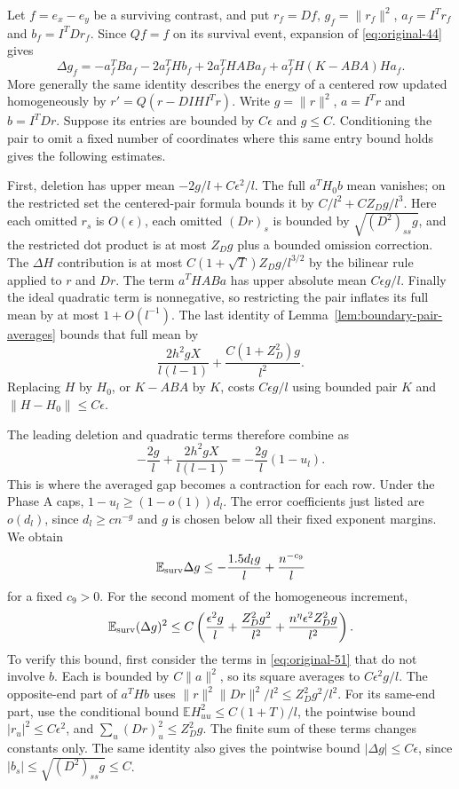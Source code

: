 Let $f=e_x-e_y$ be a surviving contrast, and put
$r_f=Df$, $g_f=\|r_f\|^2$, $a_f=I^Tr_f$ and
$b_f=I^TDr_f$.  Since $Qf=f$ on its survival event, expansion of
\eqref{eq:original-44} gives
\begin{equation}
 \Delta g_f=-a_f^TBa_f-2a_f^THb_f
       +2a_f^THABa_f+a_f^TH(K-ABA)Ha_f.
 \label{eq:original-51}
\end{equation}
More generally the same identity describes the energy of a centered
row updated homogeneously by $r'=Q(r-DIHI^Tr)$.
Write $g=\|r\|^2$, $a=I^Tr$ and $b=I^TDr$.
Suppose its entries are bounded by $C\epsilon$ and $g\le C$.
Conditioning the pair to omit a fixed number of coordinates where
this same entry bound holds gives the following estimates.

First, deletion has upper mean $-2g/l+C\epsilon^2/l$.
The full $a^TH_0b$ mean vanishes; on the restricted set the
centered-pair formula bounds it by
$C/l^2+CZ_Dg/l^3$.  Here each omitted $r_s$ is $O(\epsilon)$,
each omitted $(Dr)_s$ is bounded by
$\sqrt{(D^2)_{ss}g}$, and the restricted dot product is at most
$Z_Dg$ plus a bounded omission correction.
The $\Delta H$ contribution is at most
$C(1+\sqrt T)Z_Dg/l^{3/2}$ by the bilinear rule applied to
$r$ and $Dr$.
The term $a^THABa$ has upper absolute mean $C\epsilon g/l$.
Finally the ideal quadratic term is nonnegative, so restricting the
pair inflates its full mean by at most $1+O(l^{-1})$.
The last identity of Lemma~\ref{lem:boundary-pair-averages} bounds
that full mean by
\[
 \frac{2h^2gX}{l(l-1)}
       +\frac{C(1+Z_D^2)g}{l^2}.
\]
Replacing $H$ by $H_0$, or $K-ABA$ by $K$, costs
$C\epsilon g/l$ using bounded pair $K$ and
$\|H-H_0\|\le C\epsilon$.

The leading deletion and quadratic terms therefore combine as
\[
 -\frac{2g}{l}+\frac{2h^2gX}{l(l-1)}
 =-\frac{2g}{l}(1-u_l).
\]
This is where the averaged gap becomes a contraction for each row.
Under the Phase A caps,
$1-u_l\ge(1-o(1))d_l$.  The error coefficients just listed
are $o(d_l)$, since $d_l\ge cn^{-g}$ and $g$ is chosen below
all their fixed exponent margins.  We obtain
\begin{equation}
 \mathbb E_{\rm surv}\Delta g
 \le-\frac{1.5d_lg}{l}+\frac{n^{-c_9}}l
 \label{eq:original-52}
\end{equation}
for a fixed $c_9>0$.
For the second moment of the homogeneous increment,
\begin{equation}
 \mathbb E_{\rm surv}(\Delta g)^2
 \le C\left(
       \frac{\epsilon^2g}{l}
       +\frac{Z_D^2g^2}{l^2}
       +\frac{n^\eta\epsilon^2Z_D^2g}{l^2}
       \right).
 \label{eq:original-53}
\end{equation}
To verify this bound, first consider the terms in
\eqref{eq:original-51} that do not involve $b$.  Each is bounded
by $C\|a\|^2$, so its square averages to
$C\epsilon^2g/l$.  The opposite-end part of $a^THb$ uses
$\|r\|^2\|Dr\|^2/l^2\le Z_D^2g^2/l^2$.
For its same-end part, use the conditional bound
$\mathbb EH_{uu}^2\le C(1+T)/l$, the pointwise bound
$|r_u|^2\le C\epsilon^2$, and
$\sum_u(Dr)_u^2\le Z_D^2g$.
The finite sum of these terms changes constants only.
The same identity also gives the pointwise bound $|\Delta g|\le
C\epsilon$, since $|b_s|\le\sqrt{(D^2)_{ss}g}\le C$.

